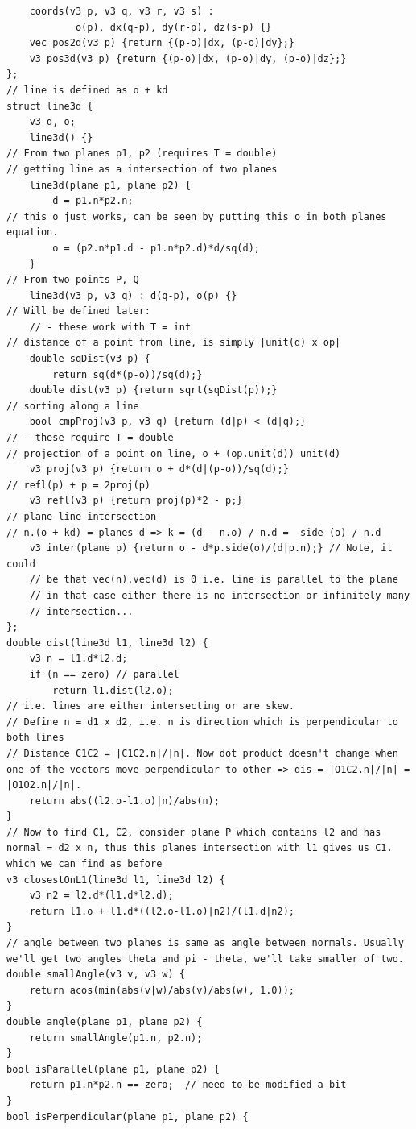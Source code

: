 \documentclass[8pt, a4paper, oneside, twocolumn]{extarticle}
\begin{document}
\begin{verbatim}
    coords(v3 p, v3 q, v3 r, v3 s) :
            o(p), dx(q-p), dy(r-p), dz(s-p) {}
    vec pos2d(v3 p) {return {(p-o)|dx, (p-o)|dy};}
    v3 pos3d(v3 p) {return {(p-o)|dx, (p-o)|dy, (p-o)|dz};}
};
// line is defined as o + kd
struct line3d {
    v3 d, o;
    line3d() {}
// From two planes p1, p2 (requires T = double)
// getting line as a intersection of two planes
    line3d(plane p1, plane p2) {
        d = p1.n*p2.n;
// this o just works, can be seen by putting this o in both planes equation.
        o = (p2.n*p1.d - p1.n*p2.d)*d/sq(d);
    }
// From two points P, Q
    line3d(v3 p, v3 q) : d(q-p), o(p) {}
// Will be defined later:
    // - these work with T = int
// distance of a point from line, is simply |unit(d) x op|
    double sqDist(v3 p) {
        return sq(d*(p-o))/sq(d);}
    double dist(v3 p) {return sqrt(sqDist(p));}
// sorting along a line
    bool cmpProj(v3 p, v3 q) {return (d|p) < (d|q);}
// - these require T = double
// projection of a point on line, o + (op.unit(d)) unit(d)
    v3 proj(v3 p) {return o + d*(d|(p-o))/sq(d);}
// refl(p) + p = 2proj(p)
    v3 refl(v3 p) {return proj(p)*2 - p;}
// plane line intersection
// n.(o + kd) = planes d => k = (d - n.o) / n.d = -side (o) / n.d
    v3 inter(plane p) {return o - d*p.side(o)/(d|p.n);} // Note, it could
    // be that vec(n).vec(d) is 0 i.e. line is parallel to the plane
    // in that case either there is no intersection or infinitely many
    // intersection...
};
double dist(line3d l1, line3d l2) {
    v3 n = l1.d*l2.d;
    if (n == zero) // parallel
        return l1.dist(l2.o);
// i.e. lines are either intersecting or are skew.
// Define n = d1 x d2, i.e. n is direction which is perpendicular to both lines
// Distance C1C2 = |C1C2.n|/|n|. Now dot product doesn't change when one of the vectors move perpendicular to other => dis = |O1C2.n|/|n| = |O1O2.n|/|n|.
    return abs((l2.o-l1.o)|n)/abs(n);
}
// Now to find C1, C2, consider plane P which contains l2 and has normal = d2 x n, thus this planes intersection with l1 gives us C1. which we can find as before
v3 closestOnL1(line3d l1, line3d l2) {
    v3 n2 = l2.d*(l1.d*l2.d);
    return l1.o + l1.d*((l2.o-l1.o)|n2)/(l1.d|n2);
}
// angle between two planes is same as angle between normals. Usually we'll get two angles theta and pi - theta, we'll take smaller of two.
double smallAngle(v3 v, v3 w) {
    return acos(min(abs(v|w)/abs(v)/abs(w), 1.0));
}
double angle(plane p1, plane p2) {
    return smallAngle(p1.n, p2.n);
}
bool isParallel(plane p1, plane p2) {
    return p1.n*p2.n == zero;  // need to be modified a bit
}
bool isPerpendicular(plane p1, plane p2) {

\end{verbatim}
\end{document}
